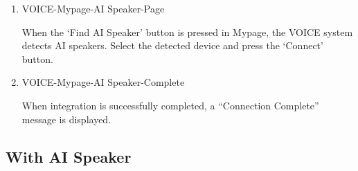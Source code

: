 \documentclass[conference]{IEEEtran}
\begin{document}
\begin{enumerate}[label=\arabic*]
\begin{enumerate}[label=\arabic*)]
        \vspace{1em}

        \item VOICE-Mypage-AI Speaker-Page\par
        \vspace{0.3em}
        When the ‘Find AI Speaker’ button is pressed in Mypage, the VOICE system detects AI speakers. Select the detected device and press the ‘Connect’ button.

        \vspace{1em}

        \item VOICE-Mypage-AI Speaker-Complete\par
        \vspace{0.3em}
        When integration is successfully completed, a “Connection Complete” message is displayed.
    \end{enumerate}
\end{enumerate}

\vspace{0.7em} %

\subsection{With AI Speaker}
\vspace{0.5em}
\end{document}
